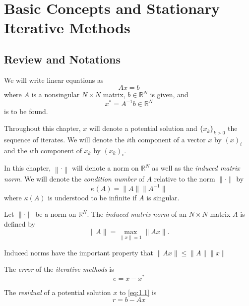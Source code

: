 \section{Basic Concepts and Stationary Iterative Methods}

\subsection{Review and Notations}
\label{sec:1.1.1}

\begin{nota}
  We will write linear equations as
  \begin{equation}
    \label{eq:1.1}
    Ax=b
  \end{equation}
  where $A$ is a nonsingular $N\times N$ matrix, $b\in\mathbb{R}^N$ is
  given, and $$x^* = A^{-1}b\in \mathbb{R}^N$$
  is to be found.
\end{nota}

\begin{nota}
  Throughout this chapter, $x$ will denote a potential solution and
  $\{x_k\}_{k>0}$ the sequence of iterates. We will denote the $i$th
component of a vector $x$ by $(x)_i$ and the $i$th component of $x_k$
by $(x_k)_i$.
\end{nota}

\begin{nota}
  In this chapter, $\left\|\cdot\right\|$ will denote a norm on $\mathbb{R}^N$ as
  well as the \emph{induced matrix norm}. We will denote the
   \emph{condition number} of $A$ relative to the norm $\|\cdot\|$ by
   $$\kappa(A)=\|A\|\|A^{-1}\|$$
  where $\kappa(A)$ is understood to be infinite if $A$ is singular.
\end{nota}

\begin{defi}
  Let $\|\cdot\|$ be a norm on $\mathbb{R}^N$. The \textsl{induced matrix norm}
  of an $N\times N$ matrix $A$ is defined by
  $$\|A\| = \max_{\|x\|=1}\|Ax\|.$$
\end{defi}

\begin{prop}
  Induced norms have the important property that $\|Ax\|\leq\|A\|\|x\|$
\end{prop}

\begin{defi}
  The \emph{error} of the \emph{iterative methods} is $$e = x - x^*$$
\end{defi}

\begin{defi}
  The \emph{residual} of a potential solution $x$ to \eqref{eq:1.1}
  is $$r=b-Ax$$
\end{defi}

